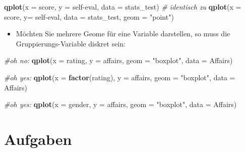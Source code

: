 \documentclass[12pt,ngerman,]{book}
\makeatletter
\newenvironment{Shaded}{\begin{snugshade}}{\end{snugshade}}
\newcommand{\KeywordTok}[1]{\textcolor[rgb]{0.13,0.29,0.53}{\textbf{{#1}}}}
\newcommand{\DataTypeTok}[1]{\textcolor[rgb]{0.13,0.29,0.53}{{#1}}}
\newcommand{\StringTok}[1]{\textcolor[rgb]{0.31,0.60,0.02}{{#1}}}
\newcommand{\CommentTok}[1]{\textcolor[rgb]{0.56,0.35,0.01}{\textit{{#1}}}}
\newcommand{\NormalTok}[1]{{#1}}
\providecommand{\tightlist}{%
  \setlength{\itemsep}{0pt}\setlength{\parskip}{0pt}}
\newenvironment{kframe}{%
\medskip{}
\setlength{\fboxsep}{.8em}
 \def\at@end@of@kframe{}%
 \ifinner\ifhmode%
  \def\at@end@of@kframe{\end{minipage}}%
  \begin{minipage}{\columnwidth}%
 \fi\fi%
 \def\FrameCommand##1{\hskip\@totalleftmargin \hskip-\fboxsep
 \colorbox{shadecolor}{##1}\hskip-\fboxsep
     \hskip-\linewidth \hskip-\@totalleftmargin \hskip\columnwidth}%
 \MakeFramed {\advance\hsize-\width
   \@totalleftmargin\z@ \linewidth\hsize
   \@setminipage}}%
 {\par\unskip\endMakeFramed%
 \at@end@of@kframe}
\renewenvironment{Shaded}{\begin{kframe}}{\end{kframe}}
\theoremstyle{definition}
\theoremstyle{definition}
\theoremstyle{remark}
\makeatother
\begin{document}
\begin{Shaded}
\begin{Highlighting}[]
\KeywordTok{qplot}\NormalTok{(}\DataTypeTok{x =} \NormalTok{score, }\DataTypeTok{y =} \NormalTok{self-eval, }\DataTypeTok{data =} \NormalTok{stats_test)  }\CommentTok{# identisch zu}
\KeywordTok{qplot}\NormalTok{(}\DataTypeTok{x =} \NormalTok{score, }\DataTypeTok{y=}  \NormalTok{self-eval, }\DataTypeTok{data =} \NormalTok{stats_test, }\DataTypeTok{geom =} \StringTok{"point"}\NormalTok{)}
\end{Highlighting}
\end{Shaded}

\begin{itemize}
\tightlist
\item
  Möchten Sie mehrere Geome für eine Variable darstellen, so muss die
  Gruppierungs-Variable diskret sein:
\end{itemize}

\begin{Shaded}
\begin{Highlighting}[]
\CommentTok{#oh no: }
\KeywordTok{qplot}\NormalTok{(}\DataTypeTok{x =} \NormalTok{rating, }\DataTypeTok{y =} \NormalTok{affairs, }\DataTypeTok{geom =} \StringTok{"boxplot"}\NormalTok{, }\DataTypeTok{data =} \NormalTok{Affairs)}

\CommentTok{#oh yes: }
\KeywordTok{qplot}\NormalTok{(}\DataTypeTok{x =} \KeywordTok{factor}\NormalTok{(rating), }\DataTypeTok{y =} \NormalTok{affairs, }\DataTypeTok{geom =} \StringTok{"boxplot"}\NormalTok{, }\DataTypeTok{data =} \NormalTok{Affairs)}

\CommentTok{#oh yes: }
\KeywordTok{qplot}\NormalTok{(}\DataTypeTok{x =} \NormalTok{gender, }\DataTypeTok{y =} \NormalTok{affairs, }\DataTypeTok{geom =} \StringTok{"boxplot"}\NormalTok{, }\DataTypeTok{data =} \NormalTok{Affairs)}
\end{Highlighting}
\end{Shaded}

\section{Aufgaben}\label{aufgaben-9}
\end{document}
